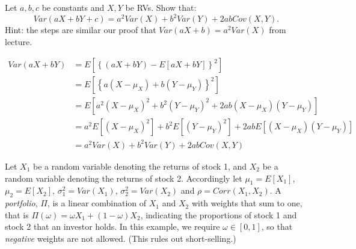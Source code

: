 \documentclass[addpoints,12pt]{exam}\usepackage[]{graphicx}\usepackage[]{xcolor}
\begin{document}
\begin{questions}
\question Let $a, b, c$ be constants and $X,Y$ be RVs.
Show that:
\[Var(aX + bY + c) = a^2 Var(X) + b^2 Var(Y) + 2ab Cov(X,Y).\]
Hint: the steps are similar our proof that $Var(aX + b) = a^2 Var(X)$ from lecture.
\begin{solution}
\begin{align*}
	Var(aX + bY) &= E\left[\left\{\left( aX + bY\right) - E[aX + bY]\right\}^2  \right]\\ 
	&= E\left[  \left\{a (X - \mu_X) + b(Y - \mu_Y)\right\}^2 \right]\\ 
	&= E\left[a^2(X-\mu_X)^2 + b^2(Y-\mu_Y)^2 + 2ab(X-\mu_X)(Y-\mu_Y)  \right]\\
	&= a^2E[(X-\mu_X)^2] + b^2 E[(Y-\mu_Y)^2] + 2ab E[(X-\mu_X)(Y-\mu_Y)]\\
	&= a^2 Var(X) + b^2 Var(Y) + 2ab Cov(X,Y)
\end{align*}
\end{solution}

\question Let $X_1$ be a random variable denoting the returns of stock 1, and $X_2$ be a random variable denoting the returns of stock 2. Accordingly let $\mu_1 = E[X_1]$, $\mu_2 = E[X_2]$, $\sigma_1^2 = Var(X_1)$, $\sigma_2^2 = Var(X_2)$ and $\rho = Corr(X_1, X_2)$. A \emph{portfolio}, $\Pi$,  is a linear combination of $X_1$ and $X_2$ with weights that sum to one, that is $\Pi(\omega) = \omega X_1 + (1-\omega)X_2$, indicating the proportions of stock 1 and stock 2 that an investor holds. In this example, we require $\omega \in [0,1]$, so that \emph{negative} weights are not allowed. (This rules out short-selling.) 
	\begin{parts}

\end{parts}
\end{questions}
\end{document}
